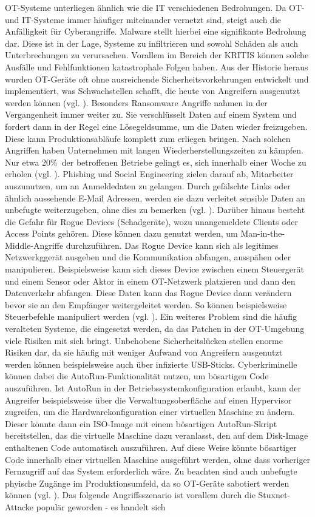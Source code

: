 OT-Systeme unterliegen ähnlich wie die IT verschiedenen Bedrohungen. Da OT- und IT-Systeme immer häufiger miteinander vernetzt sind, steigt auch die Anfälligkeit für Cyberangriffe. Malware stellt hierbei eine signifikante Bedrohung dar. Diese ist in der Lage, Systeme zu infiltrieren und sowohl Schäden als auch Unterbrechungen zu verursachen. Vorallem im Bereich der KRITIS können solche Ausfälle und Fehlfunktionen katastrophale Folgen haben. Aus der Historie heraus wurden OT-Geräte oft ohne ausreichende Sicherheitsvorkehrungen entwickelt und implementiert, was Schwachstellen schafft, die heute von Angreifern ausgenutzt werden können (vgl. \cite{avast}). Besonders Ransomware Angriffe nahmen in der Vergangenheit immer weiter zu. Sie verschlüsselt Daten auf einem System und fordert dann in der Regel eine Lösegeldsumme, um die Daten wieder freizugeben. Diese kann Produktionsabläufe komplett zum erliegen bringen. Nach solchen Angriffen haben Unternehmen mit langen Wiederherstellungszeiten zu kämpfen. Nur etwa 20\%\ der betroffenen Betriebe gelingt es, sich innerhalb einer Woche zu  erholen (vgl. \cite{secin}). Phishing und Social Engineering zielen darauf ab, Mitarbeiter auszunutzen, um an Anmeldedaten zu gelangen. Durch gefälschte Links oder ähnlich aussehende E-Mail Adressen, werden sie dazu verleitet sensible Daten an unbefugte weiterzugeben, ohne dies zu bemerken (vgl. \cite{bsibund}). \clearpage \noindent Darüber hinaus besteht die Gefahr für Rogue Devices (Schadgeräte), wozu unangemeldete Clients oder Access Points gehören. Diese können dazu genutzt werden, um Man-in-the-Middle-Angriffe durchzuführen. Das Rogue Device kann sich als legitimes Netzwerkggerät ausgeben und die Kommunikation abfangen, ausspähen oder manipulieren. Beispielsweise kann sich dieses Device zwischen einem Steuergerät und einem Sensor oder Aktor in einem OT-Netzwerk platzieren und dann den Datenverkehr abfangen. Diese Daten kann das Rogue Device dann verändern bevor sie an den Empfänger weitergeleitet werden. So können beispielsweise Steuerbefehle manipuliert werden (vgl. \cite{securityInsider3}). Ein weiteres Problem sind die häufig veralteten Systeme, die eingesetzt werden, da das Patchen in der OT-Umgebung viele Risiken mit sich bringt. Unbehobene Sicherheitslücken stellen enorme Risiken dar, da sie häufig mit weniger Aufwand von Angreifern ausgenutzt werden können beispielsweise auch über infizierte USB-Sticks. Cyberkriminelle können dabei die AutoRun-Funktionalität nutzen, um bösartigen Code auszuführen. Ist AutoRun in der Betriebssystemkonfiguration erlaubt, kann der Angreifer beispielsweise über die Verwaltungsoberfläche auf einen Hypervisor zugreifen, um die Hardwarekonfiguration einer virtuellen Maschine zu ändern. Dieser könnte dann ein ISO-Image mit einem bösartigen AutoRun-Skript bereitstellen, das die virtuelle Maschine dazu veranlasst, den auf dem Disk-Image enthaltenen Code automatisch auszuführen. Auf diese Weise könnte bösartiger Code innerhalb einer virtuellen Maschine ausgeführt werden, ohne dass vorheriger Fernzugriff auf das System erforderlich wäre. Zu beachten sind auch unbefugte phyische Zugänge im Produktionsumfeld, da so OT-Geräte sabotiert werden können (vgl. \cite{mitre}). Das folgende Angriffsszenario ist vorallem durch die Stuxnet-Attacke populär geworden - es handelt sich 